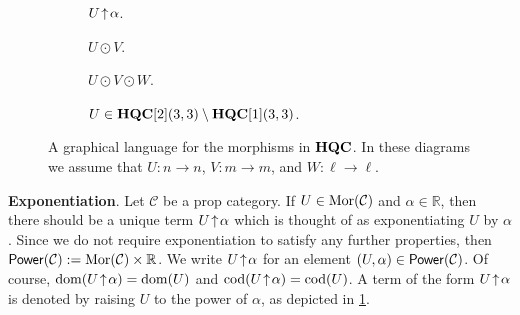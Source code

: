\begin{figure}[t]
    \begin{subfigure}[b]{0.17\textwidth}
        \centering
        \caption{$U \!\uparrow\! \alpha$.}
        \label{Fig:Extended:Power}
    \end{subfigure}
    \begin{subfigure}[b]{0.17\textwidth}
        \centering
        \caption{$U \odot V$.}
        \label{Fig:Extended:BiCtrl}
    \end{subfigure}
    \begin{subfigure}[b]{0.22\textwidth}
        \centering
        \caption{$U \odot V \odot W$.}
        \label{Fig:Extended:TriCtrl}
    \end{subfigure}
    \begin{subfigure}[b]{0.39\textwidth}
        \centering
        \caption{$U \in \mathbf{HQC}[2]( 3, 3 ) \setminus \mathbf{HQC}[1]( 3, 3 )$.}
    \end{subfigure}
    \caption{A graphical language for the morphisms in $\mathbf{HQC}$. In these diagrams we assume that $U: n \to n$, $V: m \to m$, and $W: \ell \to \ell$.}
    \label{Fig:Extended}
\end{figure}

\vspace{1em}
\noindent
\textbf{Exponentiation}.
Let $\mathcal{C}$ be a prop category.
If $U \in \operatorname{Mor}( \mathcal{C} )$ and $\alpha \in \mathbb{R}$, then there should be a unique term $U \!\uparrow\! \alpha$ which is thought of as exponentiating $U$ by $\alpha$.
Since we do not require exponentiation to satisfy any further properties, then $\mathsf{Power}( \mathcal{C} ) := \operatorname{Mor}( \mathcal{C} ) \times \mathbb{R}$.
We write $U \!\uparrow\! \alpha$ for an element $( U, \alpha ) \in \mathsf{Power}( \mathcal{C} )$.
Of course, $\operatorname{dom}( U \!\uparrow\! \alpha ) = \operatorname{dom}( U )$ and $\operatorname{cod}( U \!\uparrow\! \alpha ) = \operatorname{cod}( U )$.
A term of the form $U \!\uparrow\! \alpha$ is denoted by raising $U$ to the power of $\alpha$, as depicted in \cref{Fig:Extended:Power}.


